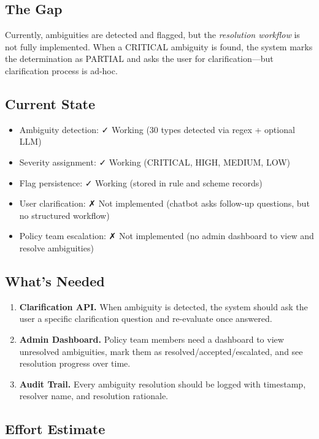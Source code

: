 \documentclass[11pt,a4paper]{report}
\begin{document}
\subsection{The Gap}

Currently, ambiguities are detected and flagged, but the \emph{resolution workflow} is not fully implemented. When a CRITICAL ambiguity is found, the system marks the determination as PARTIAL and asks the user for clarification—but clarification process is ad-hoc.

\subsection{Current State}

\begin{itemize}
  \item Ambiguity detection: ✓ Working (30 types detected via regex + optional LLM)
  \item Severity assignment: ✓ Working (CRITICAL, HIGH, MEDIUM, LOW)
  \item Flag persistence: ✓ Working (stored in rule and scheme records)
  \item User clarification: ✗ Not implemented (chatbot asks follow-up questions, but no structured workflow)
  \item Policy team escalation: ✗ Not implemented (no admin dashboard to view and resolve ambiguities)
\end{itemize}

\subsection{What's Needed}

\begin{enumerate}
  \item \textbf{Clarification API.} When ambiguity is detected, the system should ask the user a specific clarification question and re-evaluate once answered.
  \item \textbf{Admin Dashboard.} Policy team members need a dashboard to view unresolved ambiguities, mark them as resolved/accepted/escalated, and see resolution progress over time.
  \item \textbf{Audit Trail.} Every ambiguity resolution should be logged with timestamp, resolver name, and resolution rationale.
\end{enumerate}

\subsection{Effort Estimate}
\end{document}
